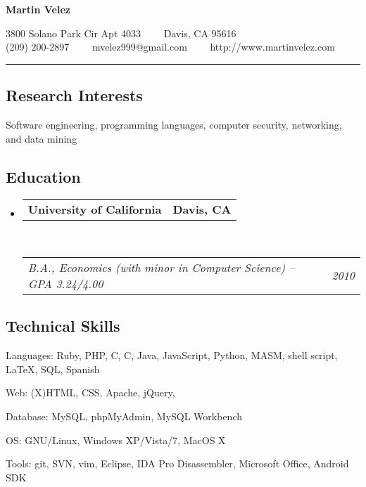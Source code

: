 \documentclass[10pt,letterpaper]{article}
\makeatletter
\newenvironment{indentsection}[1]%
{\begin{list}{}%
	{\setlength{\leftmargin}{#1}}%
	\item[]%
}
{\end{list}}
\newcommand{\headerrow}[2]
{\begin{tabular*}{\linewidth}{l@{\extracolsep{\fill}}r}
	#1 &
	#2 \\
\end{tabular*}}
\newcommand{\CPP}
{C\nolinebreak[4]\hspace{-.05em}\raisebox{.22ex}{\footnotesize\bf ++}}
\makeatother
\begin{document}
\begin{center}
{\LARGE \sc \textbf{Martin Velez}}

3800 Solano Park Cir Apt 4033\ \ \textbullet
\ \ Davis, CA 95616
\\
(209) 200-2897\ \ \textbullet
\ \ mvelez999@gmail.com\ \ \textbullet
\ \ http://www.martinvelez.com
\end{center}

\hrule
\vspace{-0.4em}
\subsection*{Research Interests}

\begin{indentsection}{\parindent}
Software engineering, programming languages, computer security, networking,
and data mining 
\end{indentsection}


\vspace{-0.4em}
\subsection*{Education}

\begin{itemize}
	\parskip=0.1em

	\item 
	\headerrow
		{\textbf{University of California}}
		{\textbf{Davis, CA}}
	\\
	\headerrow
		{\emph{B.A., Economics (with minor in Computer Science) -- GPA 3.24/4.00}}
		{\emph{2010}}

\end{itemize}


\subsection*{Technical Skills}

\begin{indentsection}{\parindent}
\begin{description*}
	\item[Languages:]
	Ruby, PHP, C, \CPP, Java, JavaScript, Python, MASM, shell script, \LaTeX, 
	SQL, Spanish
	\item[Web:]
	(X)HTML, CSS, Apache, jQuery, 
	\item[Database:]
	MySQL, phpMyAdmin, MySQL Workbench
	\item[OS:]
	GNU/Linux, Windows XP/Vista/7, MacOS X
	\item[Tools:]
	git, SVN, vim, Eclipse, IDA Pro Disassembler, Microsoft Office, Android SDK
\end{description*}
\end{indentsection}
\end{document}
